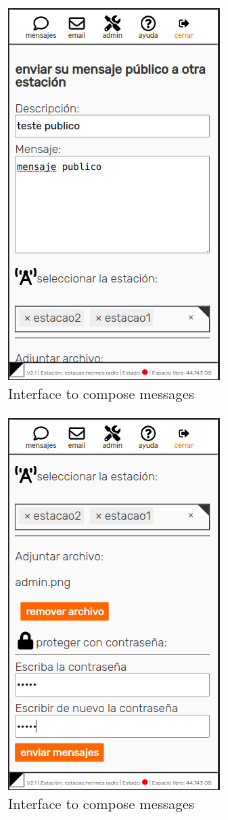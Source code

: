 \documentclass[11pt,a4paper]{article}
\begin{document}
\begin{figure}[H]
    \centering
    \includegraphics[width=0.5\textwidth]{screenshots/frontend/es/publicas.png}
    \caption{Interface to compose messages}
    \label{fig:compose}
\end{figure}

\begin{figure}[H]
    \centering
    \includegraphics[width=0.5\textwidth]{screenshots/frontend/es/publicas2.png}
    \caption{Interface to compose messages}
    \label{fig:compose}
\end{figure}
\end{document}
